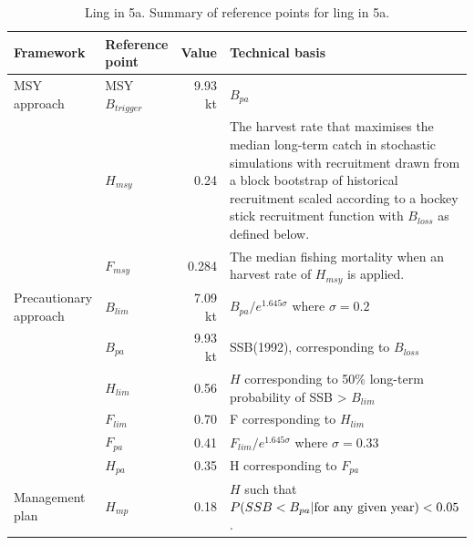 \documentclass[sansserif]{beamer}\usepackage[]{graphicx}\usepackage[]{color}
\theoremstyle{example}
\begin{document}
\begin{table}[!h]
\vspace{1mm}
\caption[]
{Ling in 5a. Summary of reference points for ling in 5a. }\label{tbl:refpoint}
\vspace{2mm}
{\centering
\scriptsize
\begin{tabular}{p{2.5cm} l r p{5cm} }
\toprule
Framework & Reference point & Value & Technical basis \\ \midrule
MSY approach & MSY $B_{trigger}$ &  9.93 kt & $B_{pa}$ \\
            & $H_{msy}$ & 0.24 & The harvest rate that maximises the median long-term catch in stochastic simulations with recruitment drawn from a block bootstrap of historical recruitment scaled according to a hockey stick recruitment function with $B_{loss}$ as defined below.\\
            & $F_{msy}$ & 0.284 & The median fishing mortality when an harvest rate of $H_{msy}$ is applied. \\
\hline
Precautionary approach & $B_{lim}$ & 7.09 kt & $B_{pa}/e^{1.645\sigma}$ where $\sigma=0.2$ \\
                      & $B_{pa}$ & 9.93 kt & SSB(1992), corresponding to $B_{loss}$ \\
                      & $H_{lim}$ & 0.56 & $H$ corresponding to 50\% long-term probability of SSB > $B_{lim}$ \\
                      & $F_{lim}$ & 0.70 & F corresponding to $H_{lim}$ \\
                      & $F_{pa}$ &  0.41 & $F_{lim}/e^{1.645\sigma}$ where $\sigma=0.33$\\
                      & $H_{pa}$ & 0.35 & H corresponding to $F_{pa}$ \\
\hline
Management plan & $H_{mp}$ & 0.18 & $H$ such that $P(SSB<B_{pa}|\textup{for any given year})<0.05$. \\
\bottomrule
\end{tabular}
\par}
\end{table}
\end{document}
